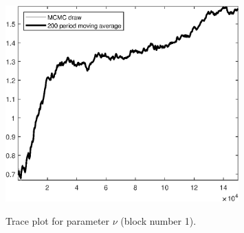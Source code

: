 \begin{figure}[H]
\centering
  \includegraphics[width=0.8\textwidth]{BRS_sectoral_wo_gmf/graphs/TracePlot_nu_blck_1}\\
    \caption{Trace plot for parameter $\nu$ (block number 1).}
\end{figure}
